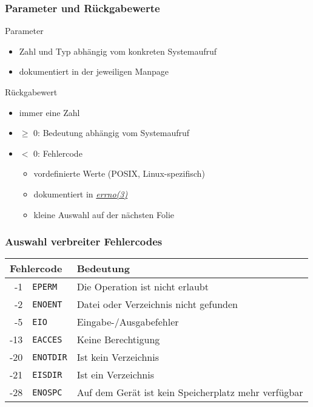 \begin{frame}
  \frametitle{Parameter und Rückgabewerte}

  \begin{block}{Parameter}
    \begin{itemize}
      \item Zahl und Typ abhängig vom konkreten Systemaufruf
      \item dokumentiert in der jeweiligen Manpage
    \end{itemize}
  \end{block}

  \begin{block}{Rückgabewert}
    \begin{itemize}
      \item immer eine Zahl
      \item $\ge$ 0: Bedeutung abhängig vom Systemaufruf
      \item $<$   0: Fehlercode
      \begin{itemize}
        \item vordefinierte Werte (POSIX, Linux-spezifisch)
        \item dokumentiert in \href{http://man7.org/linux/man-pages/man3/errno.3.html}{\emph{errno(3)}} 
        \item kleine Auswahl auf der nächsten Folie
      \end{itemize}
    \end{itemize}
  \end{block}


\end{frame}

\begin{frame}
  \frametitle{Auswahl verbreiter Fehlercodes}

  \bigskip\centering
  \begin{tabular}{|r@{~~}l|l|}
    \hline
    \multicolumn{2}{|l|}{\textbf{Fehlercode}}        & \textbf{Bedeutung} \\
    \hline
    -1      & \texttt{EPERM}     & Die Operation ist nicht erlaubt \\
    -2      & \texttt{ENOENT}    & Datei oder Verzeichnis nicht gefunden \\
    -5      & \texttt{EIO}       & Eingabe-/Ausgabefehler \\
    -13     & \texttt{EACCES}    & Keine Berechtigung \\
    -20     & \texttt{ENOTDIR}   & Ist kein Verzeichnis \\
    -21     & \texttt{EISDIR}    & Ist ein Verzeichnis \\
    -28     & \texttt{ENOSPC}    & Auf dem Gerät ist kein Speicherplatz mehr verfügbar \\
    \hline
  \end{tabular}


\end{frame}
